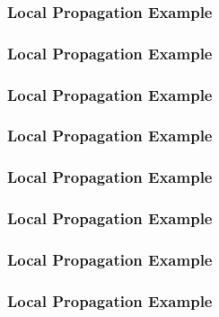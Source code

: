 \documentclass[aspectratio=169,10pt]{beamer}
\begin{document}
\begin{frame}
  \frametitle{Local Propagation Example}
  \begin{center}
    
  \end{center}
\end{frame}

\begin{frame}
  \frametitle{Local Propagation Example}
  \begin{center}
    
  \end{center}
\end{frame}

\begin{frame}
  \frametitle{Local Propagation Example}
  \begin{center}
    
  \end{center}
\end{frame}

\begin{frame}
  \frametitle{Local Propagation Example}
  \begin{center}
    
  \end{center}
\end{frame}

\begin{frame}
  \frametitle{Local Propagation Example}
  \begin{center}
    
  \end{center}
\end{frame}

\begin{frame}
  \frametitle{Local Propagation Example}
  \begin{center}
    
  \end{center}
\end{frame}

\begin{frame}
  \frametitle{Local Propagation Example}
  \begin{center}
    
  \end{center}
\end{frame}

\begin{frame}
  \frametitle{Local Propagation Example}
  \begin{center}
    
  \end{center}
\end{frame}
\end{document}
